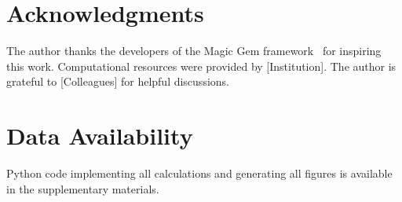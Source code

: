 \section*{Acknowledgments}

The author thanks the developers of the Magic Gem framework~\cite{magic_gems_2025} for inspiring this work. Computational resources were provided by [Institution]. The author is grateful to [Colleagues] for helpful discussions.

\section*{Data Availability}

Python code implementing all calculations and generating all figures is available in the supplementary materials.

